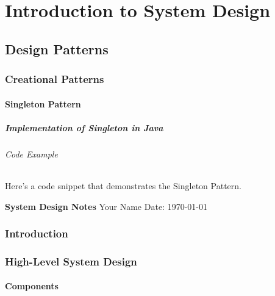 \documentclass[a4paper, 11pt]{book}
\begin{document}
\part{Introduction to System Design}


\chapter{Design Patterns}
\section{Creational Patterns}
\subsection{Singleton Pattern}
\subsubsection{Implementation of Singleton in Java}
\paragraph{Code Example}
Here’s a code snippet that demonstrates the Singleton Pattern.


    \begin{titlepage}
        \centering
        \vspace*{2in}
        \Huge \textbf{System Design Notes}
        \vfill
        \Large Your Name
        \vfill
        \Large Date: \today
    \end{titlepage}

    \newpage

    \tableofcontents
    \newpage



    \section{Introduction}
    \lipsum[1] %



    \section{High-Level System Design}
    \lipsum[2]


    \subsection{Components}
    \lipsum[3]
\end{document}
